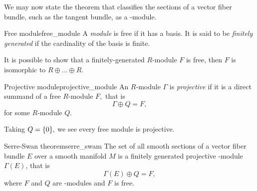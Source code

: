 We may now state the theorem that classifies the sections of a vector fiber bundle, such as the tangent bundle, as a -module.

\begin{definition}{Free module}{free_module}
    A \emph{module} is free if it has a basis. It is said to be \emph{finitely generated} if the cardinality of the basis is finite.
\end{definition}
\begin{remark}
    It is possible to show that a finitely-generated \(R\)-module \(F\) is free, then \(F\) is isomorphic to \(R \oplus \dots \oplus R\).
\end{remark}

\begin{definition}{Projective module}{projective_module}
    An \(R\)-module \(\Gamma\) is \emph{projective} if it is a direct summand of a free \(R\)-module \(F,\) that is
    \begin{equation*}
        \Gamma \oplus Q = F,
    \end{equation*}
    for some \(R\)-module \(Q\).
\end{definition}
\begin{remark}
    Taking \(Q = \{0\},\) we see every free module is projective.
\end{remark}


\begin{theorem}{Serre-Swan theorem}{serre_swam}
    The set of all smooth sections of a vector fiber bundle \(E\) over a smooth manifold \(M\) is a finitely generated projective -module \(\Gamma(E)\), that is
    \begin{equation*}
        \Gamma(E) \oplus Q = F,
    \end{equation*}
    where \(F\) and \(Q\) are -modules and \(F\) is free.
\end{theorem}

